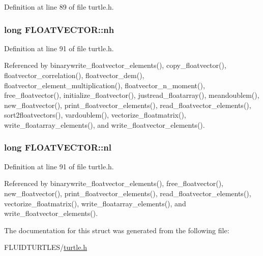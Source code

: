 Definition at line 89 of file turtle.\-h.

\hypertarget{struct_f_l_o_a_t_v_e_c_t_o_r_a069604cf1ee6da01ceb14e685d05f1d4}{
\subsubsection[{nh}]{\setlength{\rightskip}{0pt plus 5cm}long F\-L\-O\-A\-T\-V\-E\-C\-T\-O\-R\-::nh}}\label{struct_f_l_o_a_t_v_e_c_t_o_r_a069604cf1ee6da01ceb14e685d05f1d4}


Definition at line 91 of file turtle.\-h.



Referenced by binarywrite\-\_\-floatvector\-\_\-elements(), copy\-\_\-floatvector(), floatvector\-\_\-correlation(), floatvector\-\_\-dem(), floatvector\-\_\-element\-\_\-multiplication(), floatvector\-\_\-n\-\_\-moment(), free\-\_\-floatvector(), initialize\-\_\-floatvector(), justread\-\_\-floatarray(), meandoublem(), new\-\_\-floatvector(), print\-\_\-floatvector\-\_\-elements(), read\-\_\-floatvector\-\_\-elements(), sort2floatvectors(), vardoublem(), vectorize\-\_\-floatmatrix(), write\-\_\-floatarray\-\_\-elements(), and write\-\_\-floatvector\-\_\-elements().

\hypertarget{struct_f_l_o_a_t_v_e_c_t_o_r_a506e3cb41c8db89925ee596699bf5496}{
\subsubsection[{nl}]{\setlength{\rightskip}{0pt plus 5cm}long F\-L\-O\-A\-T\-V\-E\-C\-T\-O\-R\-::nl}}\label{struct_f_l_o_a_t_v_e_c_t_o_r_a506e3cb41c8db89925ee596699bf5496}


Definition at line 91 of file turtle.\-h.



Referenced by binarywrite\-\_\-floatvector\-\_\-elements(), free\-\_\-floatvector(), new\-\_\-floatvector(), print\-\_\-floatvector\-\_\-elements(), read\-\_\-floatvector\-\_\-elements(), vectorize\-\_\-floatmatrix(), write\-\_\-floatarray\-\_\-elements(), and write\-\_\-floatvector\-\_\-elements().



The documentation for this struct was generated from the following file\-:\begin{DoxyCompactItemize}
\item 
F\-L\-U\-I\-D\-T\-U\-R\-T\-L\-E\-S/\hyperlink{turtle_8h}{turtle.\-h}\end{DoxyCompactItemize}
